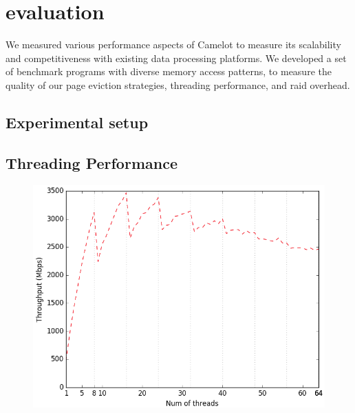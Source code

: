 \section{evaluation}
\label{sec:eval}

We measured various performance aspects of Camelot to measure its
scalability and competitiveness with existing data processing
platforms. We developed a set of benchmark programs with diverse
memory access patterns, to measure the quality of our page eviction
strategies, threading performance, and raid overhead.

\subsection{Experimental setup}

\subsection{Threading Performance}

\begin{figure}[H]
    \includegraphics[width=\columnwidth]{fig/throughputVsThreads}
    \caption{\todo{}}
    \label{fig:througputVsThreads}
\end{figure}

